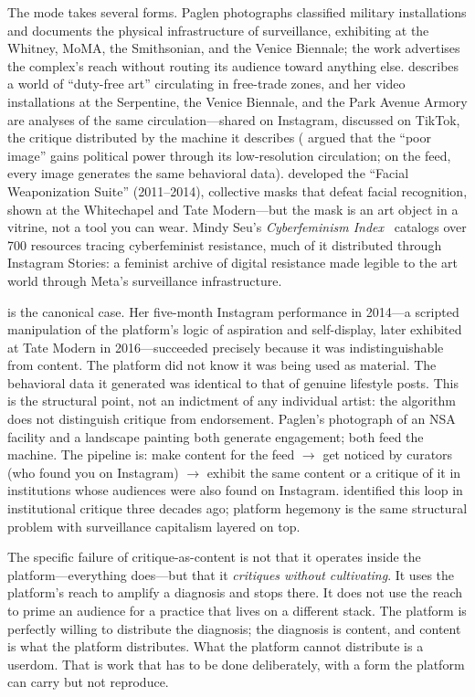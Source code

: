 \documentclass[10pt,letterpaper,twocolumn]{article}
\begin{document}
The mode takes several forms. Paglen photographs classified military installations and documents the physical infrastructure of surveillance, exhibiting at the Whitney, MoMA, the Smithsonian, and the Venice Biennale; the work advertises the complex's reach without routing its audience toward anything else. \citet{steyerl2017duty} describes a world of ``duty-free art'' circulating in free-trade zones, and her video installations at the Serpentine, the Venice Biennale, and the Park Avenue Armory are analyses of the same circulation---shared on Instagram, discussed on TikTok, the critique distributed by the machine it describes (\citet{steyerl2009poor} argued that the ``poor image'' gains political power through its low-resolution circulation; on the feed, every image generates the same behavioral data). \citet{blas2014informatic} developed the ``Facial Weaponization Suite'' (2011--2014), collective masks that defeat facial recognition, shown at the Whitechapel and Tate Modern---but the mask is an art object in a vitrine, not a tool you can wear. Mindy Seu's \emph{Cyberfeminism Index}~\citep{seu2023cyberfeminism} catalogs over 700 resources tracing cyberfeminist resistance, much of it distributed through Instagram Stories: a feminist archive of digital resistance made legible to the art world through Meta's surveillance infrastructure.

\citet{ulman2014excellences} is the canonical case. Her five-month Instagram performance in 2014---a scripted manipulation of the platform's logic of aspiration and self-display, later exhibited at Tate Modern in 2016---succeeded precisely because it was indistinguishable from content. The platform did not know it was being used as material. The behavioral data it generated was identical to that of genuine lifestyle posts. This is the structural point, not an indictment of any individual artist: the algorithm does not distinguish critique from endorsement. Paglen's photograph of an NSA facility and a landscape painting both generate engagement; both feed the machine. The pipeline is: make content for the feed $\rightarrow$ get noticed by curators (who found you on Instagram) $\rightarrow$ exhibit the same content or a critique of it in institutions whose audiences were also found on Instagram. \citet{fraser2005critique} identified this loop in institutional critique three decades ago; platform hegemony is the same structural problem with surveillance capitalism layered on top.

The specific failure of critique-as-content is not that it operates inside the platform---everything does---but that it \emph{critiques without cultivating}. It uses the platform's reach to amplify a diagnosis and stops there. It does not use the reach to prime an audience for a practice that lives on a different stack. The platform is perfectly willing to distribute the diagnosis; the diagnosis is content, and content is what the platform distributes. What the platform cannot distribute is a userdom. That is work that has to be done deliberately, with a form the platform can carry but not reproduce.
\end{document}
